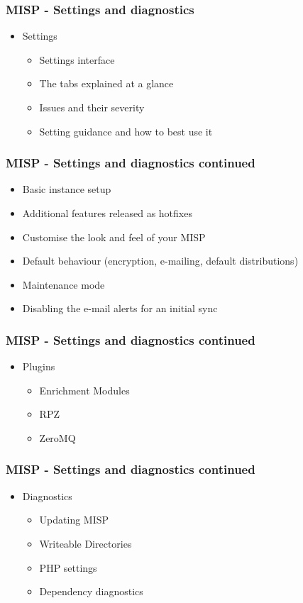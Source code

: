 \begin{frame}
    \frametitle{MISP - Settings and diagnostics}
    \begin{itemize}
        \item Settings
        \begin{itemize}
            \item Settings interface
            \item The tabs explained at a glance
            \item Issues and their severity
            \item Setting guidance and how to best use it
        \end{itemize}
     \end{itemize}
\end{frame}

\begin{frame}
    \frametitle{MISP - Settings and diagnostics continued}
        \begin{itemize}
            \item Basic instance setup
            \item Additional features released as hotfixes
            \item Customise the look and feel of your MISP
            \item Default behaviour (encryption, e-mailing, default distributions)
            \item Maintenance mode
            \item Disabling the e-mail alerts for an initial sync
        \end{itemize}
\end{frame}

\begin{frame}
    \frametitle{MISP - Settings and diagnostics continued}
        \begin{itemize}
        \item Plugins
        \begin{itemize}
            \item Enrichment Modules
            \item RPZ
            \item ZeroMQ
        \end{itemize}
        \end{itemize}
\end{frame}

\begin{frame}
    \frametitle{MISP - Settings and diagnostics continued}
    \begin{itemize}
        \item Diagnostics
        \begin{itemize}
            \item Updating MISP
            \item Writeable Directories
            \item PHP settings
            \item Dependency diagnostics
        \end{itemize}
    \end{itemize}
\end{frame}

